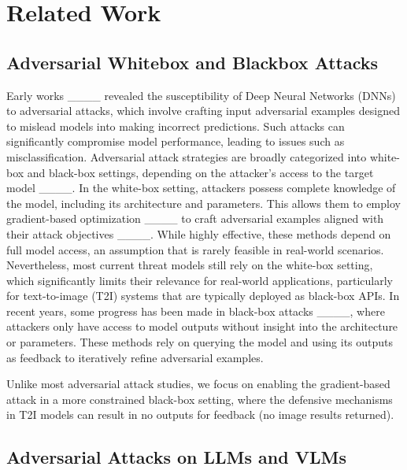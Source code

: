 \section{Related Work}
\subsection{Adversarial Whitebox and Blackbox Attacks}

Early works ____ revealed the susceptibility of Deep Neural Networks (DNNs) to adversarial attacks, which involve crafting input adversarial examples designed to mislead models into making incorrect predictions. 
Such attacks can significantly compromise model performance, leading to issues such as misclassification. 
Adversarial attack strategies are broadly categorized into white-box and black-box settings, depending on the attacker's access to the target model ____.
In the white-box setting, attackers possess complete knowledge of the model, including its architecture and parameters. This allows them to employ gradient-based optimization ____ to craft adversarial examples aligned with their attack objectives ____. While highly effective, these methods depend on full model access, an assumption that is rarely feasible in real-world scenarios.
Nevertheless, most current threat models still rely on the white-box setting, which significantly limits their relevance for real-world applications, particularly for text-to-image (T2I) systems that are typically deployed as black-box APIs. 
In recent years, some progress has been made in black-box attacks ____, where attackers only have access to model outputs without insight into the architecture or parameters.
These methods rely on querying the model and using its outputs as feedback to iteratively refine adversarial examples.


Unlike most adversarial attack studies, we focus on enabling the gradient-based attack in a more constrained black-box setting, where the defensive mechanisms in T2I models can result in no outputs for feedback (no image results returned).






\subsection{Adversarial Attacks on LLMs and VLMs}


